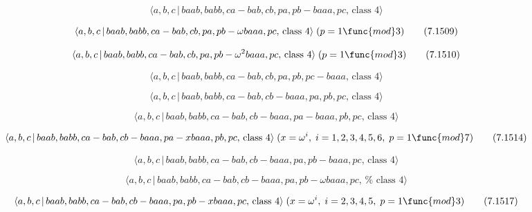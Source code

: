 \documentclass[10pt]{article}
\begin{document}
\begin{equation}
\langle a,b,c\,|\,baab,babb,ca-bab,cb,pa,pb-baaa,pc,\,\text{class }4\rangle 
\tag{7.1508}
\end{equation}

\begin{equation}
\langle a,b,c\,|\,baab,babb,ca-bab,cb,pa,pb-\omega baaa,pc,\,\text{class }%
4\rangle \;(p=1\func{mod}3)  \tag{7.1509}
\end{equation}

\begin{equation}
\langle a,b,c\,|\,baab,babb,ca-bab,cb,pa,pb-\omega ^{2}baaa,pc,\,\text{class 
}4\rangle \;(p=1\func{mod}3)  \tag{7.1510}
\end{equation}

\begin{equation}
\langle a,b,c\,|\,baab,babb,ca-bab,cb,pa,pb,pc-baaa,\,\text{class }4\rangle 
\tag{7.1511}
\end{equation}

\begin{equation}
\langle a,b,c\,|\,baab,babb,ca-bab,cb-baaa,pa,pb,pc,\,\text{class }4\rangle 
\tag{7.1512}
\end{equation}

\begin{equation}
\langle a,b,c\,|\,baab,babb,ca-bab,cb-baaa,pa-baaa,pb,pc,\,\text{class }%
4\rangle  \tag{7.1513}
\end{equation}

\begin{equation}
\langle a,b,c\,|\,baab,babb,ca-bab,cb-baaa,pa-xbaaa,pb,pc,\,\text{class }%
4\rangle \;(x=\omega ^{i},\;i=1,2,3,4,5,6,\;p=1\func{mod}7)  \tag{7.1514}
\end{equation}

\begin{equation}
\langle a,b,c\,|\,baab,babb,ca-bab,cb-baaa,pa,pb-baaa,pc,\,\text{class }%
4\rangle  \tag{7.1515}
\end{equation}

\begin{equation}
\langle a,b,c\,|\,baab,babb,ca-bab,cb-baaa,pa,pb-\omega baaa,pc,\,\text{%
class }4\rangle  \tag{7.1516}
\end{equation}

\begin{equation}
\langle a,b,c\,|\,baab,babb,ca-bab,cb-baaa,pa,pb-xbaaa,pc,\,\text{class }%
4\rangle \;(x=\omega ^{i},\;i=2,3,4,5,\;p=1\func{mod}3)  \tag{7.1517}
\end{equation}
\end{document}

